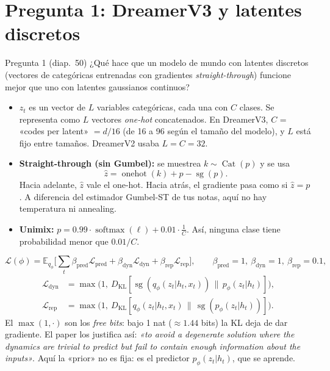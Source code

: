 \documentclass[11pt,a4paper]{article}
\newcommand{\KL}{D_{\mathrm{KL}}}
\newcommand{\E}{\mathbb{E}}
\newcommand{\sg}{\operatorname{sg}}
\begin{document}
\newpage
\section*{Pregunta 1: DreamerV3 y latentes discretos}

\begin{enunciado}{Pregunta 1 (diap.~50)}
¿Qué hace que un modelo de mundo con latentes discretos (vectores de categóricas entrenadas con gradientes \emph{straight-through}) funcione mejor que uno con latentes gaussianos continuos?
\end{enunciado}

\begin{definicion}
\begin{itemize}[leftmargin=*]
  \item $z_t$ es un vector de $L$ variables categóricas, cada una con $C$ clases. Se representa como $L$ vectores \emph{one-hot} concatenados. En DreamerV3, $C$ = «codes per latent» $=d/16$ (de 16 a 96 según el tamaño del modelo), y $L$ está fijo entre tamaños. DreamerV2 usaba $L=C=32$.
  \item \textbf{Straight-through (sin Gumbel):} se muestrea $k\sim\operatorname{Cat}(p)$ y se usa
  \[ \hat z = \operatorname{onehot}(k) + p - \sg(p). \]
  Hacia adelante, $\hat z$ vale el one-hot. Hacia atrás, el gradiente pasa como si $\hat z=p$. A diferencia del estimador Gumbel-ST de tus notas, aquí no hay temperatura ni annealing.
  \item \textbf{Unimix:} $p = 0.99\cdot\operatorname{softmax}(\ell)+0.01\cdot\tfrac{1}{C}$. Así, ninguna clase tiene probabilidad menor que $0.01/C$.
\end{itemize}
\end{definicion}

\begin{definicion}
\[ \mathcal L(\phi)=\E_{q_\phi}\Big[\textstyle\sum_t \beta_{\mathrm{pred}}\mathcal L_{\mathrm{pred}}+\beta_{\mathrm{dyn}}\mathcal L_{\mathrm{dyn}}+\beta_{\mathrm{rep}}\mathcal L_{\mathrm{rep}}\Big],\qquad \beta_{\mathrm{pred}}=1,\ \beta_{\mathrm{dyn}}=1,\ \beta_{\mathrm{rep}}=0.1, \]
\begin{align*}
\mathcal L_{\mathrm{dyn}}&=\max\!\big(1,\ \KL[\sg(q_\phi(z_t|h_t,x_t))\,\|\,p_\phi(z_t|h_t)]\big),\\
\mathcal L_{\mathrm{rep}}&=\max\!\big(1,\ \KL[q_\phi(z_t|h_t,x_t)\,\|\,\sg(p_\phi(z_t|h_t))]\big).
\end{align*}
El $\max(1,\cdot)$ son los \emph{free bits}: bajo 1 nat ($\approx1.44$ bits) la KL deja de dar gradiente. El paper los justifica así: \emph{«to avoid a degenerate solution where the dynamics are trivial to predict but fail to contain enough information about the inputs»}. Aquí la «prior» no es fija: es el predictor $p_\phi(z_t|h_t)$, que se aprende.
\end{definicion}
\end{document}

